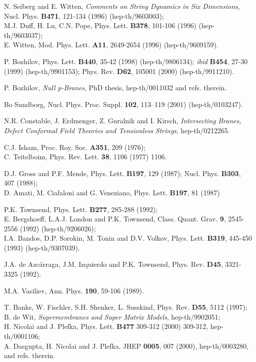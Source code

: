 \documentclass[a4paper,11pt]{article}
\begin{document}
{\begin{thebibliography}{99}
N. Seiberg and E. Witten, 
{\sl Comments on String Dynamics in Six Dimensions}, 
Nucl. Phys. {\bf B471}, 121-134 (1996) (hep-th/9603003);   
\\ M.J. Duff, H. Lu, C.N. Pope, 
 Phys. Lett. {\bf B378}, 101-106 (1996) (hep-th/9603037); 
 \\ E. Witten, 
Mod. Phys. Lett. {\bf A11}, 2649-2654 (1996) (hep-th/9609159). 


P. Bozhilov, 
Phys. Lett. {\bf B440}, 35-42 (1998) (hep-th/9806134);  {\it ibid} 
{\bf B454}, 27-30 (1999) (hep-th/9901153);  
Phys. Rev. {\bf D62}, 105001 (2000) (hep-th/9911210).

 P. Bozhilov, 
{\sl Null p-Branes}, PhD thesis, hep-th/0011032 and refs. therein. 

Bo Sundborg, Nucl. Phys. Proc. Suppl. {\bf 102}, 113--119 (2001) 
(hep-th/0103247). 


N.R. Constable, J. Erdmenger, Z. Guralnik and I. Kirsch, 
{\sl Intersecting Branes, 
Defect Conformal Field Theories and Tensionless Strings}, 
hep-th/0212265. 

C.J. Isham, Proc. Roy. Soc. {\bf A351}, 209 (1976); \\ C. Teitelboim, 
Phys.  Rev. Lett. {\bf 38}, 1106 (1977) 1106. 

D.J. Gross and P.F. Mende,   
Phys. Lett. {\bf B197}, 129 (1987); 
 Nucl. Phys. {\bf B303}, 407 (1988); 
\\ D. Amati, M. Ciafaloni and G. Veneziano, 
Phys. Lett. {\bf B197}, 81 (1987) 


P.K. Townsend, 
Phys. Lett. {\bf B277}, 285-288 (1992); 
\\ E. Bergshoeff, L.A.J. London and P.K. Townsend, 
 Class. Quant. Grav. {\bf 9}, 2545-2556 (1992) (hep-th/9206026);  
\\ I.A. Bandos, D.P. Sorokin, M. Tonin and D.V. Volkov, 
Phys. Lett. {\bf B319}, 445-450 (1993) (hep-th/9307039). 

J.A. de Azc\'arraga, J.M. Izquierdo and P.K. Townsend,  
Phys. Rev. {\bf D45}, 3321-3325 (1992).  

M.A. Vasiliev, 
Ann. Phys. {\bf 190}, 59-106 (1989). 


  T. Banks, W. Fischler, S.H. Shenker, L. Susskind, 
 Phys. Rev. {\bf D55}, 5112  (1997);  
\\ 
 B. de Wit, {\sl Supermembranes and Super Matrix Models}, 
hep-th/9902051; \\ 
H. Nicolai and J. Plefka,  Phys. Lett. {\bf B477} 309-312 (2000) 309-312, 
hep-th/0001106; \\ 
 A. Dasgupta, H. Nicolai and J. Plefka,  
JHEP {\bf 0005}, 007 (2000), hep-th/0003280, and refs. therein.




\end{thebibliography}}
\end{document}
